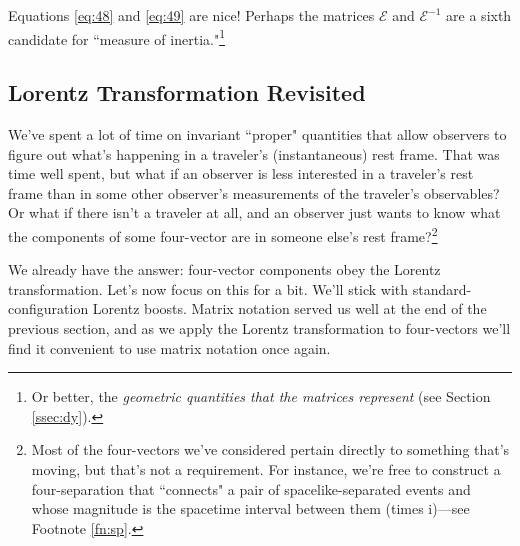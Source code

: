 \documentclass[12pt]{article}
\begin{document}
Equations \ref{eq:48} and \ref{eq:49} are nice! Perhaps the matrices $\mathcal{E}$ and $\mathcal{E}^{-1}$ are a sixth candidate for ``measure of inertia."\footnote{Or better, the \emph{geometric quantities that the matrices represent} (see Section \ref{ssec:dy}).}



\subsection{Lorentz Transformation Revisited}

We've spent a lot of time on invariant ``proper" quantities that allow observers to figure out what's happening in a traveler's (instantaneous) rest frame. That was time well spent, but what if an observer is less interested in a traveler's rest frame than in some other observer's measurements of the traveler's observables? Or what if there isn't a traveler at all, and an observer just wants to know what the components of some four-vector are in someone else's rest frame?\footnote{Most of the four-vectors we've considered pertain directly to something that's moving, but that's not a requirement. For instance, we're free to construct a four-separation that ``connects" a pair of spacelike-separated events and whose magnitude is the spacetime interval between them (times $\mathrm{i}$)---see Footnote \ref{fn:sp}.}

We already have the answer: four-vector components obey the Lorentz transformation. Let's now focus on this for a bit. We'll stick with standard-configuration Lorentz boosts. Matrix notation served us well at the end of the previous section, and as we apply the Lorentz transformation to four-vectors we'll find it convenient to use matrix notation once again.
\end{document}

